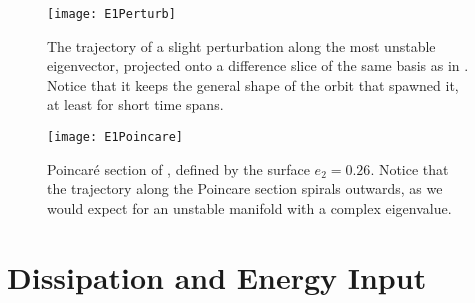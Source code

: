 \begin{figure}[h!]
\centerline{\texttt{[image: E1Perturb]}}
\caption{The trajectory of a slight perturbation along the most unstable eigenvector, projected onto a difference slice of the same basis as in . Notice that it keeps the general shape of the orbit that spawned it, at least for short time spans.}\label{fig:p8E1}
\end{figure}

\begin{figure}[h!]
\centerline{\texttt{[image: E1Poincare]}}
\caption{Poincaré section of , defined by the surface $e_2 = 0.26$. Notice that the trajectory along the Poincare section spirals outwards, as we would expect for an unstable manifold with a complex eigenvalue.}\label{fig:E1Poincare}
\end{figure}

\section{Dissipation and Energy Input} 
  
